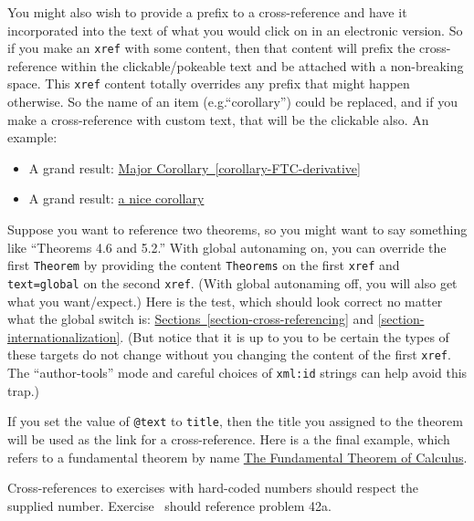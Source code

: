\documentclass{sn-jnl}
\theoremstyle{thmstyleone}%
\theoremstyle{thmstyletwo}%
\theoremstyle{thmstylethree}%
\newcommand{\xreffont}{\relax}
\newcommand{\mono}[1]{\texttt{#1}}
\numberwithin{equation}{section}
\begin{document}
%
\par
You might also wish to provide a prefix to a cross-reference and have it incorporated into the text of what you would click on in an electronic version.  So if you make an \mono{xref} with some content, then that content will prefix the cross-reference within the clickable\slash{}pokeable text and be attached with a non-breaking space.  This \mono{xref} content totally overrides any prefix that might happen otherwise.  So the name of an item (e.g.\@ ``corollary'') could be replaced, and if you make a cross-reference with custom text, that will be the clickable also.  An example:%
\begin{itemize}[label=\textbullet]
\item{}A grand result: \hyperref[corollary-FTC-derivative]{Major Corollary~{\xreffont\ref{corollary-FTC-derivative}}}%
\item{}A grand result: \hyperref[corollary-FTC-derivative]{a nice corollary}%
\end{itemize}
%
\par
Suppose you want to reference two theorems, so you might want to say something like ``Theorems 4.6 and 5.2.''  With global autonaming on, you can override the first \mono{Theorem} by providing the content \mono{Theorems} on the first \mono{xref} and \mono{text=\textquotedbl{}global\textquotedbl{}} on the second \mono{xref}.  (With global autonaming off, you will also get what you want\slash{}expect.)   Here is the test, which should look correct no matter what the global switch is:  \hyperref[section-cross-referencing]{Sections~{\xreffont\ref{section-cross-referencing}}} and \hyperref[section-internationalization]{{\xreffont\ref{section-internationalization}}}.  (But notice that it is up to you to be certain the types of these targets do not change without you changing the content of the first \mono{xref}.  The ``author-tools'' mode and careful choices of \mono{xml:id} strings can help avoid this trap.)%
\par
If you set the value of \mono{@text} to \mono{title}, then the title you assigned to the theorem will be used as the link for a cross-reference.  Here is a the final example, which refers to a fundamental theorem by name \hyperref[theorem-FTC]{The Fundamental Theorem of Calculus}.%
\par
Cross-references to exercises with hard-coded numbers should respect the supplied number.  Exercise~\hyperlink{exercise-with-hardcoded-number}{{\xreffont 9}} should reference problem 42a.%
\par
\end{document}
